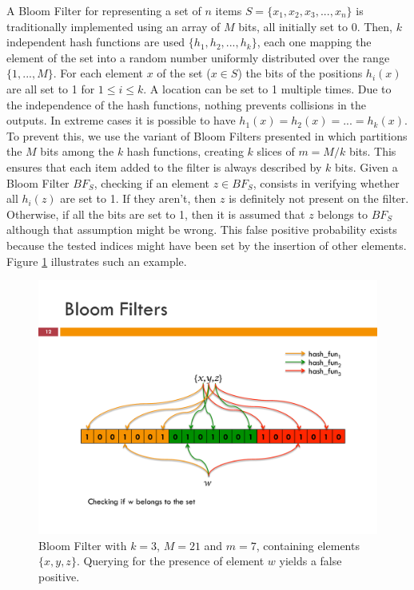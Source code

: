 A Bloom Filter for representing a set of $n$ items $S =
\{x_1,x_2,x_3,...,x_n\}$ is traditionally implemented using an array
of $M$ bits, all initially set to 0. Then, $k$ independent hash
functions are used $\{h_1,h_2,...,h_k \}$, each one mapping the
element of the set into a random number uniformly distributed over the
range $\{1,...,M\}$. For each element $x$ of the set ($x \in S $) the
bits of the positions $h_i (x)$ are all set to 1 for $1 \leq i \leq
k$. A location can be set to 1 multiple times. Due to the independence
of the hash functions, nothing prevents collisions in the outputs. In
extreme cases it is possible to have $h_1(x) = h_2(x) = ... = h_k(x)$.
To prevent this, we use the variant of Bloom Filters presented in
\cite{Chang04approximatecaches} which partitions the $M$ bits among
the $k$ hash functions, creating $k$ slices of $m = M/k$ bits. This
ensures that  each item added to the filter is always described by $k$ bits.
Given a Bloom Filter $BF_S$, checking if an element $z \in BF_S$,
consists in verifying whether all $h_i(z)$ are set to 1. If they
aren't, then $z$ is definitely not present on the filter. Otherwise,
if all the bits are set to 1, then it is assumed that $z$ belongs to
$BF_S$ although that assumption might be wrong. This false positive
probability exists because the tested indices might have been set by
the insertion of other elements. Figure \ref{fig:bloom_filter}
illustrates such an example.
\begin{figure}[htb]
  \centering
  \includegraphics[width=\textwidth]{images/bloom_filter.pdf}
  \caption{ Bloom Filter with $k=3$, $M=21$ and $m=7$, containing
    elements $\{x,y,z\}$. Querying for the presence of element $w$
    yields a false positive.}
  \label{fig:bloom_filter}
\end{figure}


